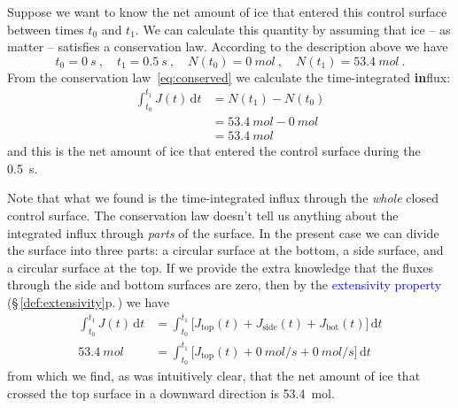 \documentclass[a4paper,12pt,%
onecolumn,oneside,%
british%
]{memoir}
\newcommand*{\di}{\mathrm{d}}%
\renewcommand*{\|}[1][]{\nonscript\:#1\vert\nonscript\:\mathopen{}}
\newcommand*{\sect}{\S}%
\renewcommand*{\autoref}[3][\sect\,\ref]{\textcolor{blue}{#3} {\color{blue}\scriptsize(\faIcon[regular]{eye}\;#1{#2}\;p.\,\pageref{#2})}}
\newcommand*{\yti}{t_{0}}
\newcommand*{\ytf}{t_{1}}
\newcommand*{\dt}{\di t}
\newcommand*{\yN}{N}
\newcommand*{\yJ}{J}
\begin{document}
Suppose we want to know the net amount of ice that entered this control surface between times $\yti$ and $\ytf$. We can calculate this quantity by assuming that ice -- as matter -- satisfies a conservation law.
According to the description above we have
\begin{equation*}
  \yti=\qty{0}{s} \ ,\quad
  \ytf=\qty{0.5}{s} \ ,\quad
  \yN(\yti)=\qty{0}{mol} \ ,\quad
  \yN(\ytf)=\qty{53.4}{mol} \ .
\end{equation*}
From the conservation law~\eqref{eq:conserved} we calculate the time-integrated \textbf{in}flux:
\begin{equation*}
  \begin{split}
    \int_{\yti}^{\ytf}\!\!\yJ(t)\,\dt &= \yN(\ytf) - \yN(\yti)
    \\&= \qty{53.4}{mol} - \qty{0}{mol}
    \\&= \qty{53.4}{mol}
  \end{split}
\end{equation*}
and this is the net amount of ice that entered the control surface during the \qty{0.5}{s}.

Note that what we found is the time-integrated influx through the \emph{whole} closed control surface. The conservation law doesn't tell us anything about the integrated influx through \emph{parts} of the surface. In the present case we can divide the surface into three parts: a circular surface at the bottom, a side surface, and a circular surface at the top. If we provide the extra knowledge that the fluxes through the side and bottom surfaces are zero, then by the \autoref{def:extensivity}{extensivity property} we have
\begin{equation*}
  \begin{split}
    \int_{\yti}^{\ytf}\!\!\yJ(t)\,\dt &=
    \int_{\yti}^{\ytf}\!\bigl[\yJ_{\textrm{top}}(t) +
    \yJ_{\text{side}}(t) +
    \yJ_{\textrm{bot}}(t)\bigr]\,\dt
    \\
      \qty{53.4}{mol} &=
      \int_{\yti}^{\ytf}\!\bigl[\yJ_{\textrm{top}}(t) +
      \qty{0}{mol/s} +
      \qty{0}{mol/s}\bigr]\,\dt
  \end{split}
\end{equation*}
from which we find, as was intuitively clear, that the net amount of ice that crossed the top surface in a downward direction is \qty{53.4}{mol}.


\bigskip
\end{document}
